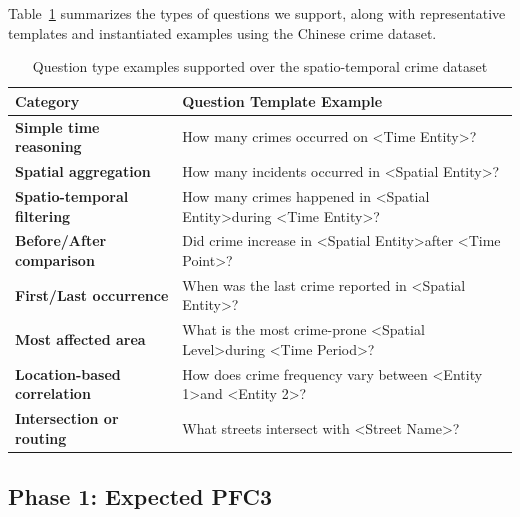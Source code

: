 Table~\ref{tab:dataset_questions} summarizes the types of questions we support, along with representative templates and instantiated examples using the Chinese crime dataset.


\begin{table}[H]
    \centering
    \caption{Question type examples supported over the spatio-temporal crime dataset}
    \label{tab:dataset_questions}
    \begin{tabular}{|p{4.5cm}|p{10cm}|}
    \hline
    \textbf{Category} & \textbf{Question Template Example} \\
    \hline
    \textbf{Simple time reasoning} & How many crimes occurred on \textless Time Entity\textgreater? \\
    \hline
    \textbf{Spatial aggregation} & How many incidents occurred in \textless Spatial Entity\textgreater? \\
    \hline
    \textbf{Spatio-temporal filtering} & How many crimes happened in \textless Spatial Entity\textgreater during \textless Time Entity\textgreater? \\
    \hline
    \textbf{Before/After comparison} & Did crime increase in \textless Spatial Entity\textgreater after \textless Time Point\textgreater? \\
    \hline
    \textbf{First/Last occurrence} & When was the last crime reported in \textless Spatial Entity\textgreater? \\
    \hline
    \textbf{Most affected area} & What is the most crime-prone \textless Spatial Level\textgreater during \textless Time Period\textgreater? \\
    \hline
    \textbf{Location-based correlation} & How does crime frequency vary between \textless Entity 1\textgreater and \textless Entity 2\textgreater? \\
    \hline
    \textbf{Intersection or routing} & What streets intersect with \textless Street Name\textgreater? \\
    \hline
    \end{tabular}
\end{table}
    



\subsection{Phase 1: Expected PFC3}

